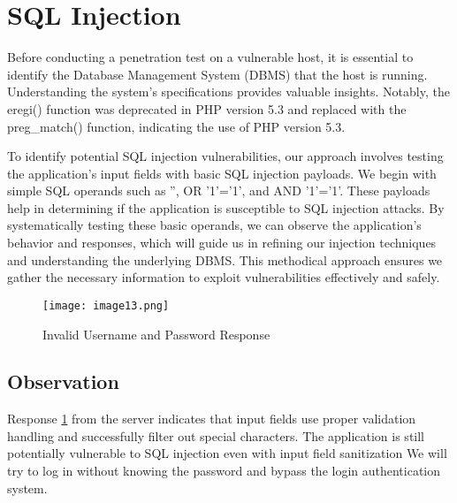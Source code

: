 \section{SQL Injection}
Before conducting a penetration test on a vulnerable host, it is essential to identify the Database Management System (DBMS) that the host is running. 
Understanding the system's specifications provides valuable insights. Notably, the eregi() function was deprecated in PHP version 5.3 and replaced with the preg\_match() function, indicating the use of PHP version 5.3.

To identify potential SQL injection vulnerabilities, our approach involves testing the application's input fields with basic SQL injection payloads. 
We begin with simple SQL operands such as '', OR '1'='1', and AND '1'='1'. 
These payloads help in determining if the application is susceptible to SQL injection attacks. 
By systematically testing these basic operands, we can observe the application's behavior and responses, which will guide us in refining our injection techniques and understanding the underlying DBMS. 
This methodical approach ensures we gather the necessary information to exploit vulnerabilities effectively and safely.

\begin{figure}[H]
    \centering
    \texttt{[image: image13.png]}
    \caption{Invalid Username and Password Response}
    \label{fig:image13}
\end{figure}

\subsection{Observation}
Response \ref{fig:image13} from the server indicates that input fields use proper validation handling and successfully filter out special characters. 
The application is still potentially vulnerable to SQL injection even with input field sanitization
We will try to log in without knowing the password and bypass the login authentication system. 

